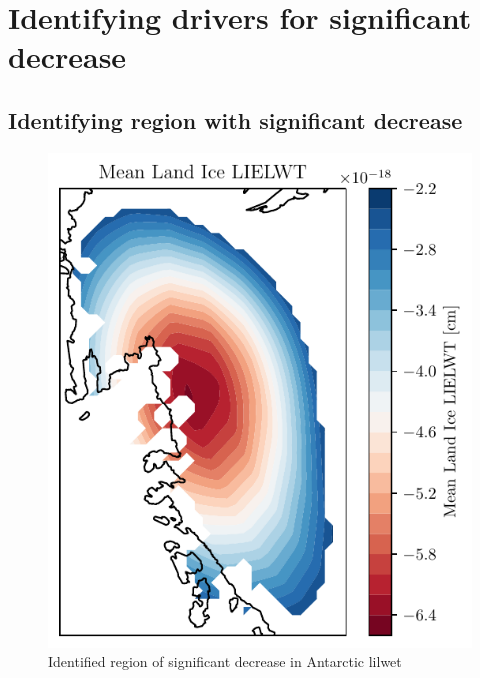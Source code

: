 \documentclass[../main.tex]{subfiles}
\begin{document}
\FloatBarrier
\section{Identifying drivers for significant decrease}

\FloatBarrier
\subsection{Identifying region with significant decrease}

\begin{figure}
    \centering
    \includegraphics{images/2021w5/individuallymade/hres/decreasing_mean_lic_distribution}
    \caption{Identified region of significant decrease in Antarctic \gls{lilwet}}
    \label{fig:decreasing_mean_lic_distribution}
\end{figure}

\FloatBarrier
\end{document}
